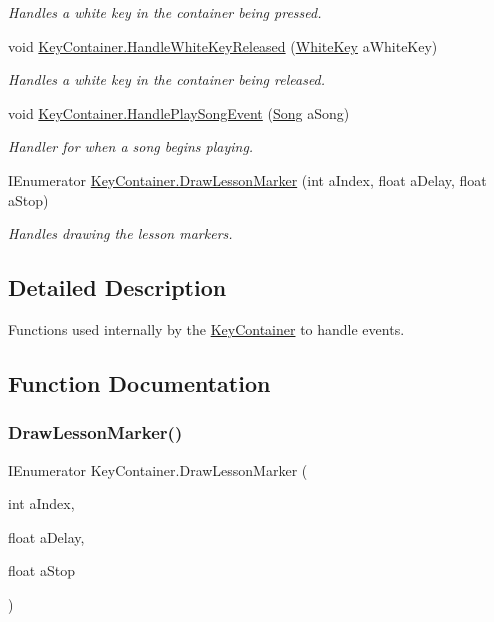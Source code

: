 \begin{DoxyCompactItemize}
\begin{DoxyCompactList}\small\item\em Handles a white key in the container being pressed. \end{DoxyCompactList}\item 
void \hyperlink{group___key_contain_handlers_ga5b98b0105300225fd79638525ad3cb3c}{Key\+Container.\+Handle\+White\+Key\+Released} (\hyperlink{class_white_key}{White\+Key} a\+White\+Key)
\begin{DoxyCompactList}\small\item\em Handles a white key in the container being released. \end{DoxyCompactList}\item 
void \hyperlink{group___key_contain_handlers_ga894c823059c5268af0954f83c04036ed}{Key\+Container.\+Handle\+Play\+Song\+Event} (\hyperlink{class_song}{Song} a\+Song)
\begin{DoxyCompactList}\small\item\em Handler for when a song begins playing. \end{DoxyCompactList}\item 
I\+Enumerator \hyperlink{group___key_contain_handlers_gac6b82feca83eaf5e3ce6901088bc552c}{Key\+Container.\+Draw\+Lesson\+Marker} (int a\+Index, float a\+Delay, float a\+Stop)
\begin{DoxyCompactList}\small\item\em Handles drawing the lesson markers. \end{DoxyCompactList}\end{DoxyCompactItemize}


\subsection{Detailed Description}
Functions used internally by the \hyperlink{class_key_container}{Key\+Container} to handle events. 

\subsection{Function Documentation}
\mbox{\label{group___key_contain_handlers_gac6b82feca83eaf5e3ce6901088bc552c}} 
\subsubsection{\texorpdfstring{Draw\+Lesson\+Marker()}{DrawLessonMarker()}}
{\footnotesize\ttfamily I\+Enumerator Key\+Container.\+Draw\+Lesson\+Marker (\begin{DoxyParamCaption}\item[{int}]{a\+Index,  }\item[{float}]{a\+Delay,  }\item[{float}]{a\+Stop }\end{DoxyParamCaption})\hspace{0.3cm}{\ttfamily [private]}}



